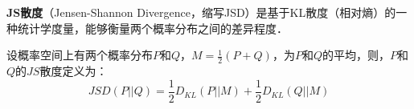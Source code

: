 
\textbf{JS散度}（Jensen-Shannon Divergence，缩写JSD）是基于KL散度（相对熵）的一种统计学度量，能够衡量两个概率分布之间的差异程度．

设概率空间上有两个概率分布$P$和$Q$，$M=\frac{1}{2}(P+Q)$，为$P$和$Q$的平均，则，$P$和$Q$的$JS$散度定义为：
\begin{equation}
JSD(P||Q)=\frac{1}{2}D_{KL}(P||M)+\frac{1}{2}D_{KL}(Q||M)
\end{equation}
